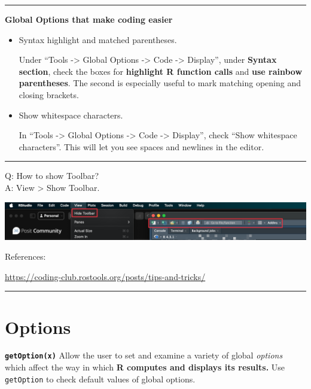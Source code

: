 \documentclass[
  a4paper,
  twoside,
  openright]{book}
\theoremstyle{definition}
\theoremstyle{definition}
\theoremstyle{definition}
\theoremstyle{definition}
\theoremstyle{remark}
\begin{document}
\begin{center}\rule{0.5\linewidth}{0.5pt}\end{center}

\textbf{Global Options that make coding easier}

\begin{itemize}
\item
  Syntax highlight and matched parentheses.

  Under ``Tools -\textgreater{} Global Options -\textgreater{} Code -\textgreater{} Display'', under \textbf{Syntax section}, check the boxes for \textbf{highlight R function calls} and \textbf{use rainbow parentheses}. The second is especially useful to mark matching opening and closing brackets.
\item
  Show whitespace characters.

  In ``Tools -\textgreater{} Global Options -\textgreater{} Code -\textgreater{} Display'', check ``Show whitespace characters''. This will let you see spaces and newlines in the editor.
\end{itemize}

\begin{center}\rule{0.5\linewidth}{0.5pt}\end{center}

Q: How to show Toolbar?\\
A: View \textgreater{} Show Toolbar.

\includegraphics[width=1\linewidth]{images/toolbar}

References:

\url{https://coding-club.rostools.org/posts/tips-and-tricks/}

\begin{center}\rule{0.5\linewidth}{0.5pt}\end{center}

\section{Options}\label{options}

\textbf{\texttt{getOption(x)}} Allow the user to set and examine a variety of global \emph{options} which affect the way in which \textbf{R computes and displays its results.} Use \texttt{getOption} to check default values of global options.
\end{document}
